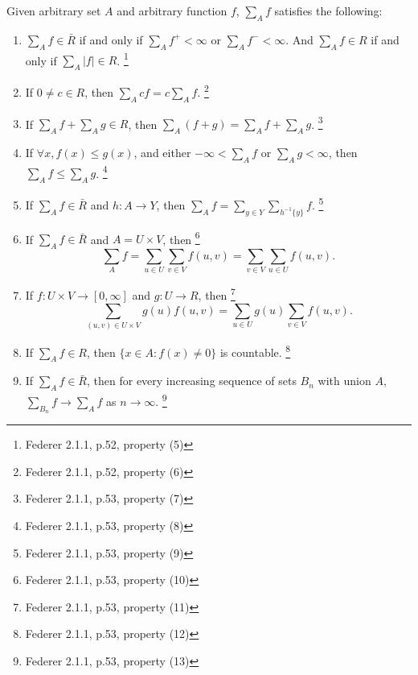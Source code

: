 \begin{lemma} \label{L:sum_gen}
Given arbitrary set $A$ and arbitrary function $f$, $\sum_A f$ satisfies the
following:
\begin{enumerate}
\item $\sum_A f\in \bar{R}$ if and only if $\sum_A f^+<\infty$ or
  $\sum_A f^- <\infty$. And $\sum_A f\in R$ if and only if 
  $\sum_A |f|\in R$.
  \footnote{Federer 2.1.1, p.52, property (5)}
\item If $0\ne c\in R$, then $\sum_A cf=c\sum_A f$.
  \footnote{Federer 2.1.1, p.52, property (6)}
\item If $\sum_A f+\sum_A g\in R$, then $\sum_A (f+g)=\sum_A f + \sum_A g$.
  \footnote{Federer 2.1.1, p.53, property (7)}
\item If $\forall x, f(x)\leq g(x)$, and either $-\infty<\sum_A f$ or
  $\sum_A g<\infty$, then $\sum_A f\leq \sum_A g$.
  \footnote{Federer 2.1.1, p.53, property (8)}
\item If $\sum_A f\in \bar{R}$ and $h:A\rightarrow Y$, then
  $\sum_A f = \sum_{y\in Y} \sum_{h^{-1}\{y\}} f$.
  \footnote{Federer 2.1.1, p.53, property (9)}
\item If $\sum_A f\in \bar{R}$ and $A=U\times V$, then
  \footnote{Federer 2.1.1, p.53, property (10)}
\[
  \sum_A f=\sum_{u\in U} \sum_{v\in V} f(u,v)
    =\sum_{v\in V} \sum_{u\in U}f(u,v).
\]
\item If $f:U\times V\rightarrow [0,\infty]$ and $g:U\rightarrow R$, then
  \footnote{Federer 2.1.1, p.53, property (11)}
\[
  \sum_{(u,v)\in U\times V} g(u)f(u,v)
    =\sum_{u\in U} g(u)\sum_{v\in V}f(u,v).
\]
\item If $\sum_A f\in R$, then $\{x\in A:f(x)\neq 0\}$ is countable.
  \footnote{Federer 2.1.1, p.53, property (12)}
\item If $\sum_A f\in \bar{R}$, then for every increasing sequence of sets $B_n$
with union $A$, $\sum_{B_n} f\rightarrow \sum_A f$ as $n\rightarrow \infty$.
  \footnote{Federer 2.1.1, p.53, property (13)}
\end{enumerate}
\end{lemma}


